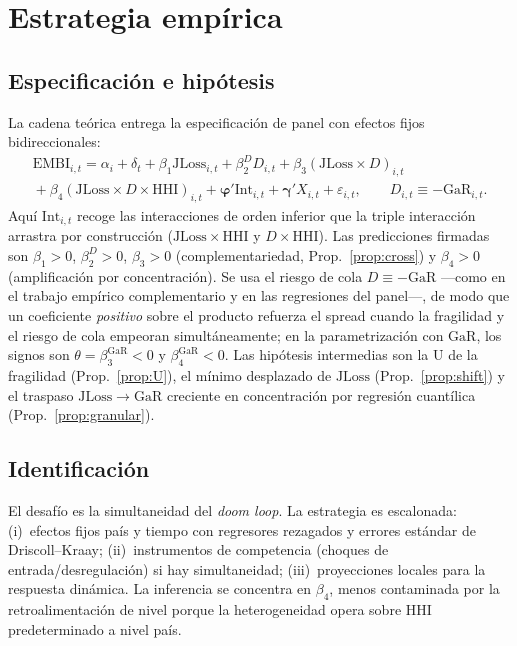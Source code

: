\documentclass[11pt]{article}
\theoremstyle{plain}
\theoremstyle{definition}
\theoremstyle{remark}
\newcommand{\JLoss}{\mathrm{JLoss}}
\newcommand{\EMBI}{\mathrm{EMBI}}
\newcommand{\GaR}{\mathrm{GaR}}
\newcommand{\HHI}{\mathrm{HHI}}
\newcommand{\1}{\mathbf{1}}
\begin{document}
\section{Estrategia empírica}\label{sec:empirico}

\subsection{Especificación e hipótesis}
La cadena teórica entrega la especificación de panel con efectos fijos bidireccionales:
\begin{multline}
\EMBI_{i,t}=\alpha_i+\delta_t+\beta_1\JLoss_{i,t}+\beta_2^{D} D_{i,t}+\beta_3(\JLoss\times D)_{i,t}\\
{}+\beta_4(\JLoss\times D\times\HHI)_{i,t}+\boldsymbol{\varphi}'\mathrm{Int}_{i,t}+\boldsymbol{\gamma}'X_{i,t}+\varepsilon_{i,t},\qquad D_{i,t}\equiv-\GaR_{i,t}.
\label{eq:emp}
\end{multline}
Aquí $\mathrm{Int}_{i,t}$ recoge las interacciones de orden inferior que la triple interacción arrastra por construcción ($\JLoss\times\HHI$ y $D\times\HHI$). Las predicciones firmadas son $\beta_1>0$, $\beta_2^{D}>0$, $\beta_3>0$ (complementariedad, Prop.~\ref{prop:cross}) y $\beta_4>0$ (amplificación por concentración). Se usa el riesgo de cola $D\equiv-\GaR$ —como en el trabajo empírico complementario y en las regresiones del panel—, de modo que un coeficiente \emph{positivo} sobre el producto refuerza el spread cuando la fragilidad y el riesgo de cola empeoran simultáneamente; en la parametrización con $\GaR$, los signos son $\theta=\beta_3^{\GaR}<0$ y $\beta_4^{\GaR}<0$. Las hipótesis intermedias son la U de la fragilidad (Prop.~\ref{prop:U}), el mínimo desplazado de $\JLoss$ (Prop.~\ref{prop:shift}) y el traspaso $\JLoss\to\GaR$ creciente en concentración por regresión cuantílica (Prop.~\ref{prop:granular}).

\subsection{Identificación}
El desafío es la simultaneidad del \textit{doom loop}. La estrategia es escalonada: (i)~efectos fijos país y tiempo con regresores rezagados y errores estándar de Driscoll--Kraay; (ii)~instrumentos de competencia (choques de entrada/desregulación) si hay simultaneidad; (iii)~proyecciones locales para la respuesta dinámica. La inferencia se concentra en $\beta_4$, menos contaminada por la retroalimentación de nivel porque la heterogeneidad opera sobre $\HHI$ predeterminado a nivel país.
\end{document}
